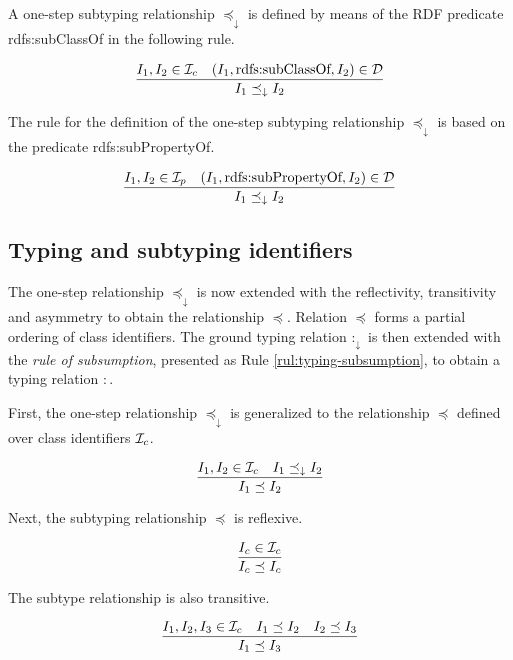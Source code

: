 \documentclass[runningheads]{llncs}
\newcommand{\darr}{\downarrow}
\newcommand{\I}{{\cal I}}
\newcommand{\Ic}{{\cal I}_c}
\newcommand{\Ip}{{\cal I}_p}
\begin{document}
A one-step subtyping relationship $\preceq_\darr$ is defined by means
of the RDF predicate rdfs:sub\-ClassOf in the following rule.

\begin{equation}
\dfrac{I_1,I_2\in\Ic \quad (I_1,\text{rdfs:subClassOf},I_2)\in \D}
{I_1 \preceq_\darr\/I_2}
\end{equation}

The rule for the definition of the one-step subtyping relationship
$\preceq_\darr$ is based on the predicate rdfs:subPropertyOf.

\begin{equation}
\dfrac{I_1,I_2\in\Ip \quad (I_1,\text{rdfs:subPropertyOf},I_2)\in \D}
      {I_1\preceq_\darr\/I_2}
\end{equation}





\subsection{Typing and subtyping identifiers\label{sec:idents-typing}}

The one-step relationship $\preceq_\darr$ is now extended with the
reflectivity, transitivity and asymmetry to obtain the relationship
$\preceq$. Relation $\preceq$ forms a partial ordering of class
identifiers. The ground typing relation $:_\darr$ is then extended
with the \emph{rule of subsumption}, presented as Rule
\ref{rul:typing-subsumption}, to obtain a typing relation $:$.

First, the one-step relationship $\preceq_\darr$ is generalized to the
relationship $\preceq$ defined over class identifiers $\I_c$.

\begin{equation}
\label{rul:Ic-extended}
\dfrac{I_1,I_2\in\I_c \quad I_1\preceq_\darr I_2}
      {I_1 \preceq I_2}
\end{equation}

Next, the subtyping relationship $\preceq$ is reflexive.

\begin{equation}
\label{rul:Ic-reflexivity}
\dfrac{I_c\in \I_c}
      {I_c\preceq\/I_c}
\end{equation}

The subtype relationship is also transitive. 

\begin{equation}
\label{rul:Ic-transitivity}
\dfrac{I_1,I_2,I_3\in\I_c \quad I_1\preceq\/I_2 \quad I_2\preceq\/I_3}
      {I_1\preceq\/I_3}   
\end{equation}
\end{document}

